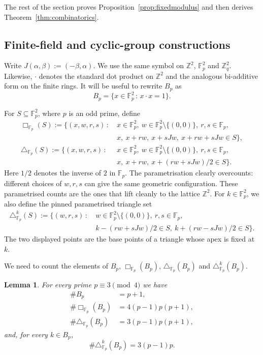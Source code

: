 \documentclass[11pt,reqno]{amsart}
\newtheorem{lemma}[theorem]{Lemma}
\numberwithin{equation}{section}
\begin{document}
The rest of the section proves Proposition~\ref{prop:fixedmodulus} and then derives Theorem~\ref{thm:combinatorics}.

\subsection{Finite-field and cyclic-group constructions}
Write $J(\alpha,\beta):=(-\beta,\alpha)$. We use the same symbol on $\mathbb{Z}^2$, $\mathbb{F}_p^2$ and $\mathbb{Z}_q^2$. Likewise, $\cdot$ denotes the standard dot product on $\mathbb{Z}^2$ and the analogous bi-additive form on the finite rings.
It will be useful to rewrite $B_p$ as
\[ B_p = \{x\in\mathbb{F}_p^2 \,:\, x\cdot x=1\}. \]

For $S\subseteq\mathbb{F}_p^2$, where $p$ is an odd prime, define
\begin{align*}
\Box_{\mathbb{F}_p}(S):=\{(x,w,r,s) \,:\ & x\in\mathbb{F}_p^2,
\ w\in \mathbb{F}_p^2\setminus\{(0,0)\},\ r,s\in\mathbb{F}_p,\\
&x,\ x+rw,\ x+sJw,\ x+rw+sJw\in S\},\\
\triangle_{\mathbb{F}_p}(S):=\{(x,w,r,s) \,:\ & x\in\mathbb{F}_p^2,
\ w\in \mathbb{F}_p^2\setminus\{(0,0)\},\ r,s\in\mathbb{F}_p,\\
&x,\ x+rw,\ x+(rw+sJw)/2\in S\}.
\end{align*}
Here $1/2$ denotes the inverse of $2$ in $\mathbb{F}_p$.
The parametrisation clearly overcounts: different choices of $w,r,s$ can give the same geometric configuration. These parametrised counts are the ones that lift cleanly to the lattice $\mathbb{Z}^2$.
For $k\in \mathbb{F}_p^2$, we also define the pinned parametrised triangle set
\begin{align*}
\triangle^k_{\mathbb{F}_p}(S) := \{(w,r,s) \,:\ & w\in\mathbb{F}_p^2\setminus\{(0,0)\}, \ r,s\in\mathbb{F}_p,\\
& k-(rw+sJw)/2\in S,
\ k+(rw-sJw)/2\in S\}.
\end{align*}
The two displayed points are the base points of a triangle whose apex is fixed at $k$.

We need to count the elements of $B_p$, $\Box_{\mathbb{F}_p}(B_p)$, $\triangle_{\mathbb{F}_p}(B_p)$ and $\triangle^k_{\mathbb{F}_p}(B_p)$.

\begin{lemma}\label{lm:field}
For every prime $p\equiv3\pmod4$ we have
\begin{align} 
\#B_p & = p+1, \label{eq:Fpcount1} \\
\#\Box_{\mathbb{F}_p}(B_p) & = 4(p-1)p(p+1), \label{eq:Fpcount2} \\
\#\triangle_{\mathbb{F}_p}(B_p) & = 3(p-1)p(p+1), \label{eq:Fpcount3}
\end{align}
and, for every $k\in B_p$,
\begin{equation}
\#\triangle^k_{\mathbb{F}_p}(B_p) = 3(p-1)p. \label{eq:Fpcount4}
\end{equation}
\end{lemma}
\end{document}
